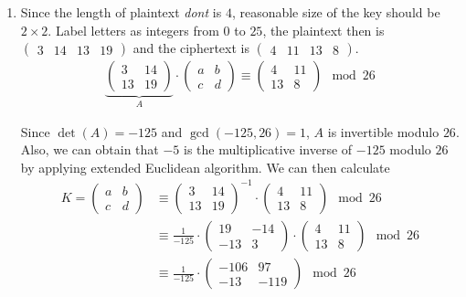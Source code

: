 \documentclass[11pt,a4paper]{article}
\begin{document}
\begin{enumerate}
	\item Since the length of plaintext \textit{dont} is $4$, reasonable size of the key should be $2\times 2$. Label letters as integers from $0$ to $25$, the plaintext then is $\begin{pmatrix} 3 & 14 & 13 & 19 \end{pmatrix}$ and the ciphertext is $\begin{pmatrix} 4 & 11 & 13 & 8 \end{pmatrix}$.
	\begin{align*}
		\underbrace{\begin{pmatrix} 3 & 14 \\ 13 & 19 \end{pmatrix}}_{A} \cdot \begin{pmatrix} a & b \\ c & d \end{pmatrix} \equiv \begin{pmatrix} 4 & 11 \\ 13 & 8 \end{pmatrix} \mod 26 
	\end{align*}
	\par Since $\det(A)=-125$ and $\gcd(-125, 26)=1$, $A$ is invertible modulo $26$. Also, we can obtain that $-5$ is the multiplicative inverse of $-125$ modulo $26$ by applying extended Euclidean algorithm. We can then calculate
	\begin{align*}
		K = \begin{pmatrix} a & b \\ c & d \end{pmatrix} &\equiv \begin{pmatrix} 3 & 14 \\ 13 & 19 \end{pmatrix}^{-1} \cdot \begin{pmatrix} 4 & 11 \\ 13 & 8 \end{pmatrix} \mod 26 \\
		&\equiv \frac{1}{-125} \cdot \begin{pmatrix} 19 & -14 \\ -13 & 3 \end{pmatrix} \cdot \begin{pmatrix} 4 & 11 \\ 13 & 8 \end{pmatrix} \mod 26 \\
		&\equiv \frac{1}{-125} \cdot \begin{pmatrix} -106 & 97 \\ -13 & -119 \end{pmatrix} \mod 26 \\

\end{align*}
\end{enumerate}
\end{document}

